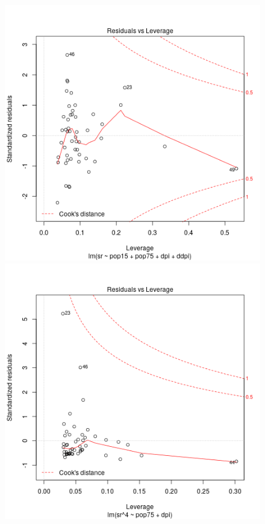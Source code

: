 \begin{figure}[p]
\begin{center}
    \includegraphics[scale=0.4]{plot15.png} \hspace*{2cm} \includegraphics[scale=0.4]{plot25.png} \\

\end{center}
\end{figure}
